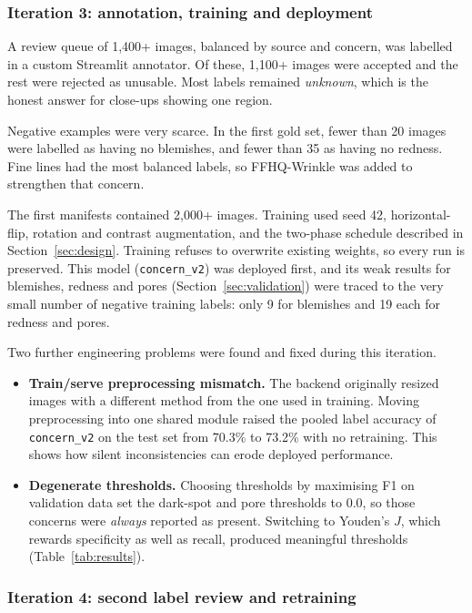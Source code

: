 \subsubsection*{Iteration 3: annotation, training and deployment}

A review queue of 1,400+ images, balanced by source and concern, was labelled in a custom Streamlit annotator. Of these, 1,100+ images were accepted and the rest were rejected as unusable. Most labels remained \emph{unknown}, which is the honest answer for close-ups showing one region.

Negative examples were very scarce. In the first gold set, fewer than 20 images were labelled as having no blemishes, and fewer than 35 as having no redness. Fine lines had the most balanced labels, so FFHQ-Wrinkle was added to strengthen that concern.

The first manifests contained 2,000+ images. Training used seed 42, horizontal-flip, rotation and contrast augmentation, and the two-phase schedule described in Section~\ref{sec:design}. Training refuses to overwrite existing weights, so every run is preserved. This model (\texttt{concern\_v2}) was deployed first, and its weak results for blemishes, redness and pores (Section~\ref{sec:validation}) were traced to the very small number of negative training labels: only 9 for blemishes and 19 each for redness and pores.

Two further engineering problems were found and fixed during this iteration.

\begin{itemize}
  \item \textbf{Train/serve preprocessing mismatch.} The backend originally resized images with a different method from the one used in training. Moving preprocessing into one shared module raised the pooled label accuracy of \texttt{concern\_v2} on the test set from 70.3\% to 73.2\% with no retraining. This shows how silent inconsistencies can erode deployed performance.
  \item \textbf{Degenerate thresholds.} Choosing thresholds by maximising F1 on validation data set the dark-spot and pore thresholds to 0.0, so those concerns were \emph{always} reported as present. Switching to Youden's $J$, which rewards specificity as well as recall, produced meaningful thresholds (Table~\ref{tab:results}).
\end{itemize}

\subsubsection*{Iteration 4: second label review and retraining}

